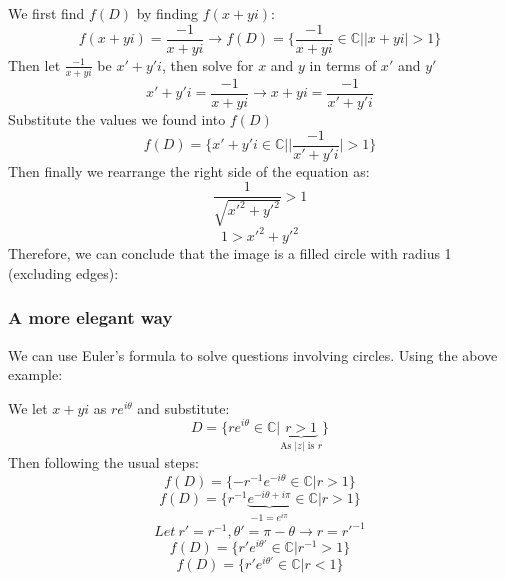 \documentclass{article}
\begin{document}
\begin{center}
    We first find $f(D)$ by finding $f(x+yi)$:
    \[f(x+yi)=\frac{-1}{x+yi}\rightarrow f(D)=\{\frac{-1}{x+yi}\in \mathds{C}||x+yi|>1\}\]
    Then let $\frac{-1}{x+yi}$ be $x'+y'i$, then solve for $x$ and $y$ in terms of $x'$ and $y'$
    \[x'+y'i=\frac{-1}{x+yi}\rightarrow x+yi=\frac{-1}{x'+y'i}\]
    Substitute the values we found into $f(D)$
    \[f(D)=\{x'+y'i\in \mathds{C}||\frac{-1}{x'+y'i}|>1\}\]
    Then finally we rearrange the right side of the equation as:
    \[\frac{1}{\sqrt{x'^2+y'^2}}>1\]
    \[1>x'^2+y'^2\]
    Therefore, we can conclude that the image is a filled circle with radius 1 (excluding edges):

\end{center}

\subsubsection{A more elegant way}
We can use Euler's formula to solve questions involving circles. Using the above example:
\begin{center}
    We let $x+yi$ as $re^{i\theta}$ and substitute:
    \[D=\{re^{i\theta}\in\mathds{C}|\underbrace{r>1}_{\text{As $|z|$ is $r$}}\}\]
    Then following the usual steps:
    \[f(D)=\{-r^{-1}e^{-i\theta}\in \mathds{C}| r > 1\}\]
    \[f(D)=\{r^{-1}\underbrace{e^{-i\theta+i\pi}}_{-1=e^{i\pi}}\in \mathds{C}| r > 1\}\]
    \[Let\ r'=r^{-1}, \theta'=\pi-\theta\rightarrow r=r'^{-1}\]
    \[f(D)=\{r'e^{i\theta'}\in \mathds{C}| r^{-1} > 1\}\]
    \[f(D)=\{r'e^{i\theta'}\in \mathds{C}| r < 1\}\]
\end{center}
\end{document}
